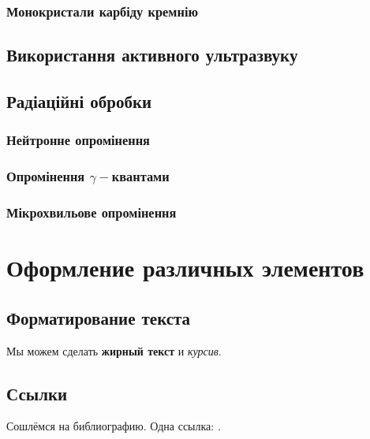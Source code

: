 \documentclass[a4paper,14pt,oneside,openany]{memoir}
\begin{document}
\subsection{Монокристали карбіду кремнію}

\section{Використання активного ультразвуку}


\section{Радіаційні обробки}
\subsection{Нейтронне опромінення}

\subsection{Опромінення $\gamma-$квантами}

\subsection{Мікрохвильове опромінення}







\chapter{Оформление различных элементов} \label{chapt1}

\section{Форматирование текста} \label{sect1_1}


Мы можем сделать \textbf{жирный текст} и \textit{курсив}.


\section{Ссылки} \label{sect1_2}
Сошлёмся на библиографию.
\cite{Olikh:Visn2003,Olikh:SPQEO2003,Olikh:SEMT2004,Olikh:PJE2004,Olikh:PhChOM2005,
Olikh:PZTF2006,Olikh:MRS2007,Olikh:SEMT2007,Olikh:Visn2007,Olikh:FTP2009,Olikh:SPQEO2010,Gorb2010,
Olikh:UPJ2010,Olikh:SEMT2011,Olikh:FTP2011,Olikh:2013IEEE,Olikh:UPJ2013,Olikh:FTP2013,Olikh:SEMT2013,
Olikh:UPJ2014,Olikh:Ultras,OlikhJAP,Olikh:Rev,Olikh:Ultras2016,Olikh2016JSem,Olikh2018JAP,
1UNCPS,3Tomsk,1SEMST,50IUFFC,9APTTE,2005IUS,ICU2007SC,ICU2007GA,2007MRS,3UNCPS,6DrogGorb,6Drog,
12IvFr,4UNCPS,4Kremen,7Drog,5UNCPS,2012Ternop,14Plivk,8Drog,2013Buk,6UNCPS,2014IUSOl,2014IUS,6SEMST,
2015ICU,6CPFCS,7UNCPS,2017MEICS}
Одна ссылка: \cite[с.~54]{OlikhJAP}.
\end{document}
